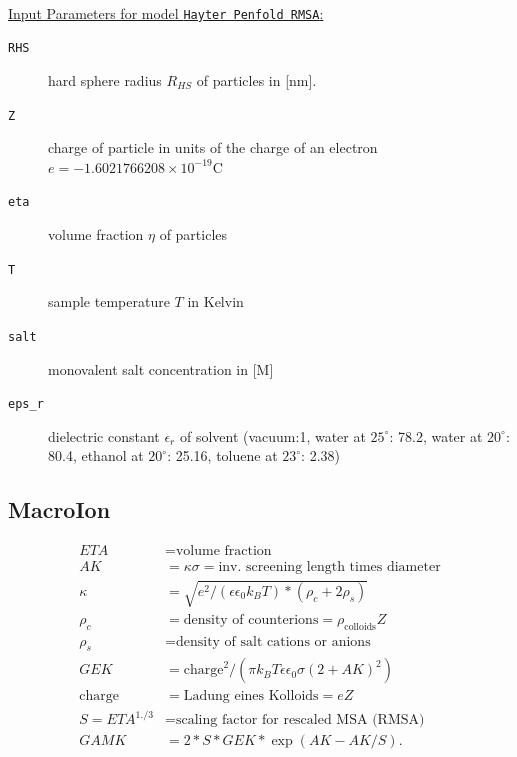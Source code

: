 \hspace{1pt}\\
\underline{Input Parameters for model \texttt{Hayter Penfold RMSA}:}\\
\begin{description}
\item[\texttt{RHS}] hard sphere radius $R_{HS}$ of particles in [nm].
\item[\texttt{Z}] charge of particle in units of the charge of an electron $e=-1.602 176 620 8 \times 10^{-19} \mathrm{C}$
\item[\texttt{eta}] volume fraction $\eta$ of particles
\item[\texttt{T}] sample temperature $T$ in Kelvin
\item[\texttt{salt}] monovalent salt concentration in [M]
\item[\texttt{eps\_r}] dielectric constant $\epsilon_r$ of solvent (vacuum:1, water at $25^\circ$: 78.2, water at $20^\circ$: 80.4, ethanol at $20^\circ$: 25.16, toluene at $23^\circ$: 2.38)
\end{description}



\clearpage
\subsection{MacroIon}

\begin{subequations}
\begin{align}
ETA &= \text{volume fraction} \\
AK &= \kappa \sigma = \text{inv. screening length times diameter} \\
\kappa &=\sqrt{ e^2/(\epsilon \epsilon_0 k_B T)*(\rho_c+2 \rho_s) }\\
\rho_c &= \text{density of counterions} = \rho_\text{colloids} Z \\
\rho_s &= \text{density of salt cations or anions} \\
GEK &=\text{charge}^2/( \pi k_B T \epsilon \epsilon_0 \sigma (2+AK)^2)\\
\text{charge} &= \text{Ladung eines Kolloids} = e Z\\
S=ETA^{1./3} &= \text{scaling factor for rescaled MSA (RMSA)}\\
GAMK&=2*S*GEK*\exp(AK-AK/S).
\end{align}
\end{subequations}

